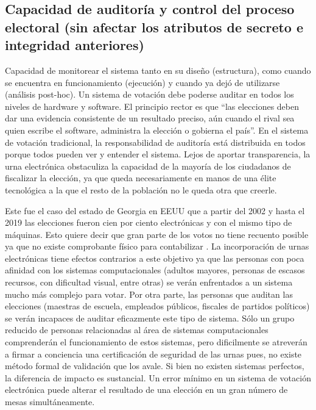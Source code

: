 \subsection{Capacidad de auditoría y control del proceso electoral (sin afectar los atributos de secreto e integridad anteriores)}
Capacidad de monitorear el sistema tanto en su diseño (estructura), como cuando se encuentra en funcionamiento (ejecución) y cuando ya dejó de utilizarse (análisis post-hoc). Un sistema de votación debe poderse auditar en todos los niveles de hardware y software. El principio rector es que 
``las elecciones deben dar una evidencia consistente de un resultado preciso, aún cuando el rival sea quien escribe el software, administra la elección o gobierna el país''.\newline
En el sistema de votación tradicional, la responsabilidad de auditoría está distribuida en todos porque todos pueden ver y entender el sistema. Lejos de aportar transparencia, la urna electrónica obstaculiza la capacidad de la mayoría de los ciudadanos de fiscalizar la elección, ya que queda necesariamente en manos de una élite tecnológica a la que el resto de la población no le queda otra que creerle.

Este fue el caso del estado de Georgia en EEUU que a partir del 2002 y hasta el 2019 las elecciones fueron cien por ciento electrónicas y con el mismo tipo de máquinas. Esto quiere decir que gran parte de los votos no tiene recuento posible ya que no existe comprobante físico para contabilizar \cite{eleccionesGeorgia}.\newline
La incorporación de urnas electrónicas tiene efectos contrarios a este objetivo ya que las personas con poca afinidad con los sistemas computacionales (adultos mayores, personas de escasos recursos, con dificultad visual, entre otras) se verán enfrentados a un sistema mucho más complejo para votar. Por otra parte, las personas que auditan las elecciones (maestras de escuela, empleados públicos, fiscales de partidos políticos) se verán incapaces de auditar eficazmente este tipo de sistema. Sólo un grupo reducido de personas relacionadas al área de sistemas computacionales comprenderán el funcionamiento de estos sistemas, pero dificilmente se atreverán a firmar a conciencia una certificación de seguridad de las urnas pues, no existe método formal de validación que los avale. Si bien no existen sistemas perfectos, la diferencia de impacto es sustancial. Un error mínimo en un sistema de votación electrónica puede alterar el resultado de una elección en un gran número de mesas simultáneamente.

